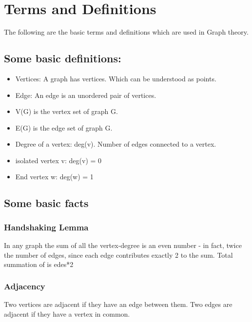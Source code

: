 \hypertarget{terms-and-definitions}{%
\section{Terms and Definitions}\label{terms-and-definitions}}
The following are the basic terms and definitions which are
used in Graph theory.
\hypertarget{some-basic-definitions}{%
\subsection{Some basic definitions:}\label{some-basic-definitions}}

\begin{itemize}
\item
  Vertices: A graph has vertices. Which can be understood as points.
\item
  Edge: An edge is an unordered pair of vertices.
\item
  V(G) is the vertex set of graph G.
\item
  E(G) is the edge set of graph G.
\item
  Degree of a vertex: deg(v). Number of edges connected to a vertex.
\item
  isolated vertex v: deg(v) = 0
\item
  End vertex w: deg(w) = 1
\end{itemize}

\hypertarget{some-basic-facts}{%
\subsection{Some basic facts}\label{some-basic-facts}}

\hypertarget{handshaking-lemma}{%
\subsubsection{Handshaking Lemma}\label{handshaking-lemma}}

In any graph the sum of all the vertex-degree is an even number - in
fact, twice the number of edges, since each edge contributes exactly 2
to the sum. Total summation of is edes*2

\hypertarget{adjacency}{%
\subsubsection{Adjacency}\label{adjacency}}

Two vertices are adjacent if they have an edge between them. Two edges
are adjacent if they have a vertex in common.

